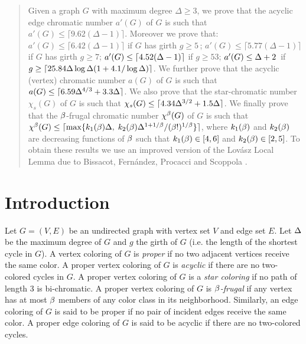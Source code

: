 \documentclass[11pt]{article}
\begin{document}
\def\lc{\lceil}
\def\rc{\rceil}




\begin{abstract}
Given a graph  $G$ with maximum degree $\Delta\ge 3$,
we prove that the
acyclic edge chromatic number $a'(G)$ of $G$ is such that $a'(G)\le\lceil 9.62 (\Delta-1)\rceil$. Moreover we prove that:
 $a'(G)\le \lceil 6.42(\Delta-1)\rceil$ if  $G$  has girth $g\ge 5\,$;   $a'(G)\le \lceil5.77 (\Delta-1)\rc$ if
 $G$  has girth $g\ge 7$;  $a'(G)\le \lc4.52(\D-1)\rc$ if $g\ge 53$;
 $a'(G)\le \Delta+2\,$ if $g\ge  \lceil25.84\Delta\log\Delta(1+ 4.1/\log\Delta)\rceil$.
 We further prove that the  acyclic (vertex) chromatic number $a(G)$ of $G$  is such that
 $a(G)\le \lc 6.59 \Delta^{4/3}+3.3\D\rc$.
We also prove that the  star-chromatic number $\chi_s(G)$ of $G$ is such that $\chi_s(G)\le
\lc4.34\Delta^{3/2}+ 1.5\D\rc$.
We finally prove that the $\beta$-frugal
chromatic number $\chi^\beta(G)$ of $G$ is such that
$\chi^\b(G)\le \lc\max\{k_1(\b)\D,\; k_2(\b){\D^{1+1/\b}/ (\b!)^{1/\b}}\}\rc$, where $k_1(\beta)$ and $k_2(\beta)$ are decreasing functions of $\beta$ such that
$k_1(\beta)\in[4, 6]$ and
$k_2(\beta)\in[2,5]$.
 To obtain these results  we use an improved version of the Lov\'asz Local Lemma due to Bissacot, Fern\'andez, Procacci and Scoppola \cite{BFPS}.
\end{abstract}

\section{Introduction}
Let $G=(V,E)$ be an undirected graph with vertex set $V$ and edge set $E$.  Let $\Delta$ be the maximum degree
 of $G$ and  $g$ the girth of $G$
(i.e. the length of the shortest cycle in $G$).
A vertex coloring of $G$ is  {\it proper} if no two adjacent vertices receive the same color.
A proper vertex coloring of $G$ is
{\it acyclic} if there are no two-colored cycles in $G$. A proper vertex coloring of $G$ is
a {\it star coloring} if no path of  length 3 is bi-chromatic.
A proper vertex coloring of $G$ is {\it $\beta$-frugal} if any vertex has at most
$\beta$  members of any color class in its neighborhood.
Similarly, an edge coloring of $G$ is said to be proper if no pair of
incident edges receive the same color. A proper edge coloring of $G$ is said to be
acyclic if there are no two-colored cycles.
\end{document}
